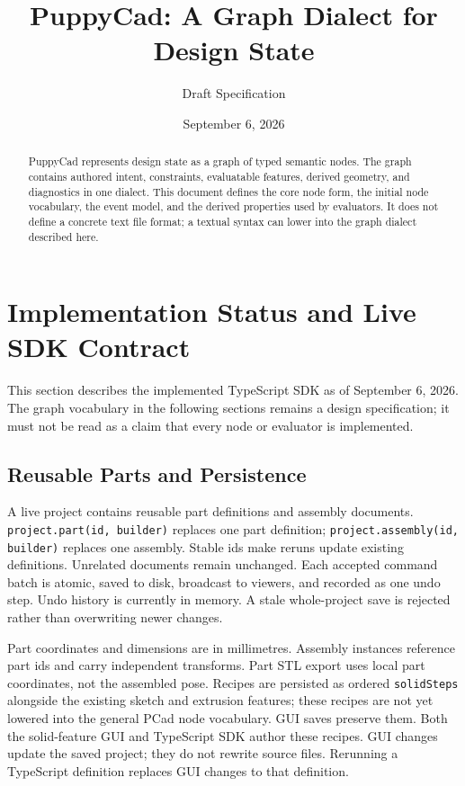 \documentclass[11pt]{article}
\title{PuppyCad: A Graph Dialect for Design State}
\author{Draft Specification}
\date{September 6, 2026}
\newcommand{\Type}[1]{\texttt{#1}}
\begin{document}
\maketitle

\begin{abstract}
PuppyCad represents design state as a graph of typed semantic nodes. The graph contains authored intent, constraints, evaluatable features, derived geometry, and diagnostics in one dialect. This document defines the core node form, the initial node vocabulary, the event model, and the derived properties used by evaluators. It does not define a concrete text file format; a textual syntax can lower into the graph dialect described here.
\end{abstract}

\section{Implementation Status and Live SDK Contract}

This section describes the implemented TypeScript SDK as of September 6, 2026.
The graph vocabulary in the following sections remains a design specification;
it must not be read as a claim that every node or evaluator is implemented.

\subsection{Reusable Parts and Persistence}

A live project contains reusable part definitions and assembly documents.
\Type{project.part(id, builder)} replaces one part definition;
\Type{project.assembly(id, builder)} replaces one assembly.
Stable ids make reruns update existing definitions. Unrelated documents remain
unchanged. Each accepted command batch is atomic, saved to disk, broadcast to
viewers, and recorded as one undo step. Undo history is currently in memory.
A stale whole-project save is rejected rather than overwriting newer changes.

Part coordinates and dimensions are in millimetres. Assembly instances reference
part ids and carry independent transforms. Part STL export uses local part
coordinates, not the assembled pose. Recipes are persisted as ordered
\Type{solidSteps} alongside the existing sketch and extrusion features;
these recipes are not yet lowered into the general PCad node vocabulary.
GUI saves preserve them. Both the solid-feature GUI and TypeScript SDK author
these recipes. GUI changes update the saved project; they do not rewrite source
files. Rerunning a TypeScript definition replaces GUI changes to that definition.
\end{document}
